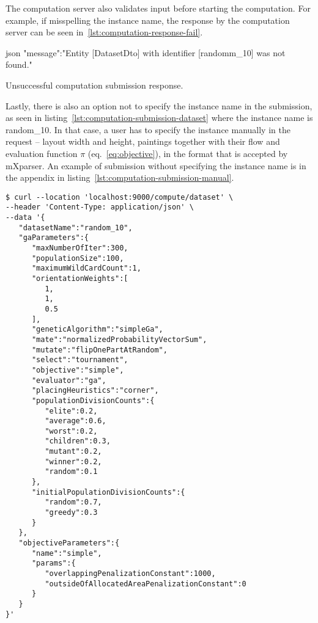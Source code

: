 The computation server also validates input before starting the computation.
For example, if misspelling the instance name, the response by the computation server can be seen in~\ref{lst:computation-response-fail}.

\begin{listing}[h!]
    \centering
    \begin{cminted}[autogobble,breaklines=true]{json}
    {
        "message":"Entity [DatasetDto] with identifier [randomm_10] was not found."
    }
    \end{cminted}
    \caption[Unsuccessful computation submission response]
    {Unsuccessful computation submission response.}
    \label{lst:computation-response-fail}
\end{listing}

Lastly, there is also an option not to specify the instance name in the submission, as seen
in listing~\ref{lst:computation-submission-dataset} where the instance name is random\_10.
In that case, a user has to specify the instance manually in the request – layout width and height,
paintings together with their flow and evaluation function $\pi$ (eq.~\ref{eq:objective}), in the format that is accepted by
mXparser\footnotemark[4].
An example of submission without specifying the instance name is in the appendix in listing~\ref{lst:computation-submission-manual}.

\begin{listing}[h!]
\centering
\begin{verbatim}
$ curl --location 'localhost:9000/compute/dataset' \
--header 'Content-Type: application/json' \
--data '{
   "datasetName":"random_10",
   "gaParameters":{
      "maxNumberOfIter":300,
      "populationSize":100,
      "maximumWildCardCount":1,
      "orientationWeights":[
         1,
         1,
         0.5
      ],
      "geneticAlgorithm":"simpleGa",
      "mate":"normalizedProbabilityVectorSum",
      "mutate":"flipOnePartAtRandom",
      "select":"tournament",
      "objective":"simple",
      "evaluator":"ga",
      "placingHeuristics":"corner",
      "populationDivisionCounts":{
         "elite":0.2,
         "average":0.6,
         "worst":0.2,
         "children":0.3,
         "mutant":0.2,
         "winner":0.2,
         "random":0.1
      },
      "initialPopulationDivisionCounts":{
         "random":0.7,
         "greedy":0.3
      }
   },
   "objectiveParameters":{
      "name":"simple",
      "params":{
         "overlappingPenalizationConstant":1000,
         "outsideOfAllocatedAreaPenalizationConstant":0
      }
   }
}'
\end{verbatim}
\cprotect\caption[Example of computation submission with instance name]
{Example of computation submission of random\_10 instance using \verb|curl|\footnotemark[2] to a computation server running on \verb|localhost:9000|.}
\label{lst:computation-submission-dataset}
\end{listing}

\footnotetext[3]{\url{https://www.scala-sbt.org/}}
